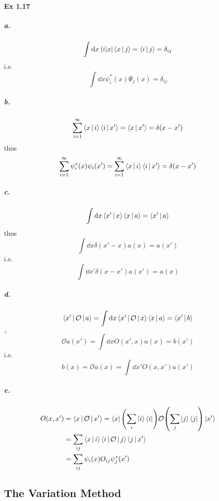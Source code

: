 \documentclass[a4paper]{article}
\DeclareMathOperator{\sumiinf}{\sum_{i=1}^{\infty}}
\newcommand{\ex}[1]{\paragraph{Ex #1}}
\newcommand{\subex}[1]{\subparagraph{#1}}
\numberwithin{equation}{subsection}
\begin{document}
\ex{1.17}
\subex{a.}
\begin{equation}\label{key}
\int\dd x \Bra{i|x}\Braket{x|j} = \Braket{i|j} = \delta_{ij}
\end{equation}
i.e.
\begin{equation}\label{key}
\int\dd x \psi_i^*(x)\Psi_j(x) = \delta_{ij}
\end{equation}
\subex{b.}
\begin{equation}\label{key}
\sumiinf \Braket{x|i}\Braket{i|x'} = \Braket{x|x'} = \delta(x-x')
\end{equation}
thus
\begin{equation}\label{key}
 \sumiinf \psi_i^*(x)\psi_i(x') = \sumiinf \Braket{x|i}\Braket{i|x'} = \delta(x-x')
\end{equation}
\subex{c.}
\begin{equation}\label{key}
\int\dd x \Braket{x'|x}\Braket{x|a} = \Braket{x'|a}
\end{equation}
thus
\begin{equation}\label{key}
\int\dd x \delta(x' - x) a(x) = a(x')
\end{equation}
i.e.
\begin{equation}\label{key}
\int\dd x' \delta(x-x')a(x') = a(x)
\end{equation}
\subex{d.}
\begin{equation}\label{key}
\Braket{x' | \mathcal{O} | a} = \int\dd x \Braket{x' | \mathcal{O} | x} \Braket{x|a} = \Braket{x'|b}
\end{equation}
$ \therefore $
\begin{equation}\label{key}
\mathcal{O}a(x') = \int\dd x O(x',x)a(x) = b(x')
\end{equation}
i.e.
\begin{equation}\label{key}
b(x) = \mathcal{O}a(x) = \int\dd x' O(x,x')a(x')
\end{equation}
\subex{e.}
\begin{equation}\label{key}
\begin{aligned}
O(x,x') &= \Braket{x | \mathcal{O} | x'} = \bra{x} \qty(\sum_i \ket{i}\bra{i}) \mathcal{O} \qty(\sum_j\ket{j}\bra{j}) \ket{x'}\\
&= \sum_{ij} \Braket{x|i}\Braket{i | \mathcal{O} | j} \Braket{j|x'}\\
&= \sum_{ij} \psi_i(x) O_{ij} \psi_j^*(x')
\end{aligned}
\end{equation}

\subsection{The Variation Method}
\end{document}
